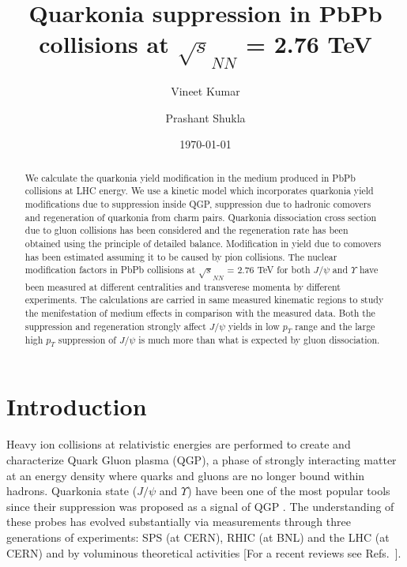 \documentclass[aps,prc,preprint,superscriptaddress,showpacs,showkeys]{revtex4-1}
\begin{document}
\newcommand{\Jpsi}{J/\psi}
\newcommand{\pT}{p_{T}}

\title{{\Large Quarkonia suppression in PbPb collisions at $\sqrt s_{NN}$ =  2.76 TeV }}
\author{\large Vineet Kumar}
\author{\large Prashant Shukla}
\date{\today}

\begin{abstract}
  We calculate the quarkonia yield modification in the medium produced in PbPb
collisions at LHC energy. We use a kinetic model which incorporates quarkonia yield 
modifications due to suppression inside QGP, suppression due to hadronic comovers and 
regeneration of quarkonia from charm pairs. 
 Quarkonia dissociation cross section due to gluon collisions has been considered and
the regeneration rate has been obtained using the principle of detailed balance.
 Modification in yield due to comovers has been estimated assuming it to be caused by
pion collisions.  
  The nuclear modification factors in PbPb collisions at $\sqrt s_{NN}$ =  2.76 TeV for 
both $\Jpsi$ and $\Upsilon$ have been measured at different centralities and transverese 
momenta by different experiments. The calculations are carried in same measured kinematic 
regions to study the menifestation of medium effects in comparison with the measured data.
 Both the suppression and regeneration strongly affect $\Jpsi$ yields in low $\pT$ range 
and the large high $\pT$ suppression of $\Jpsi$ is much more than what is expected by 
gluon dissociation.
\end{abstract}

\maketitle
\section{Introduction}
  Heavy ion collisions at relativistic energies are performed to create and characterize 
Quark Gluon plasma (QGP), a phase of strongly interacting matter at an energy density 
where quarks and gluons are no longer bound within hadrons. 
  Quarkonia state ($\Jpsi$ and $\Upsilon$) have been one of the most popular tools 
since their suppression was proposed as a signal of QGP \cite{SATZ}.
  The understanding of these probes has evolved substantially via measurements 
through three generations of experiments: SPS (at CERN), RHIC (at BNL) and the LHC (at CERN) 
and by voluminous theoretical activities [For a recent reviews see 
Refs.~\cite{Schukraft,Kluberg:2009wc,Brambilla:2010cs,Rapp:2008tf}].
\end{document}

